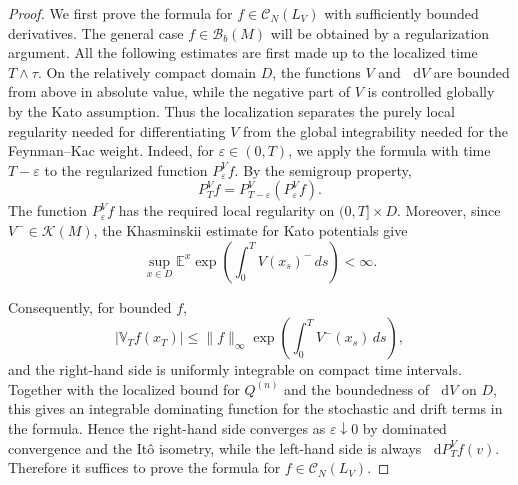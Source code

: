 \documentclass[11pt,twoside, reqno]{article}
\newcommand{\ed}{\mathop{}\!\mathrm{d}}
\newcommand\1{\mathbbm{1}}
\theoremstyle{definition}
\numberwithin{equation}{section}
\begin{document}
\begin{proof}
We first prove the formula for \(f\in\mathcal C_N(L_V)\) with sufficiently
bounded derivatives. The general case \(f\in\mathcal B_b(M)\) will be obtained
by a regularization argument. All the following estimates are first made
up to the localized time \(T\wedge\tau\).  On the relatively compact domain
\(D\), the functions \(V\) and \(\ed V\) are bounded from above in absolute
value, while the negative part of \(V\) is controlled globally by the Kato
assumption.  Thus the localization separates the purely local regularity
needed for differentiating \(V\) from the global integrability needed for the
Feynman--Kac weight.
Indeed, for \(\varepsilon\in(0,T)\), we apply the formula with time
\(T-\varepsilon\) to the regularized function \(P_\varepsilon^Vf\). By the
semigroup property,
\[
        P_T^Vf=P_{T-\varepsilon}^V(P_\varepsilon^Vf).
\]
The function \(P_\varepsilon^Vf\) has the required local regularity on
\((0,T]\times D\). Moreover, since $V^-\in \mathcal{K}(M)$, the
Khasminskii estimate for Kato potentials give
\[
        \sup_{x\in D}
        \mathbb E^x
        \exp\left(
        \int_0^T V(x_s)^-\,ds
        \right)<\infty.
\]

Consequently, for bounded \(f\),
\[
        |\mathbb V_T f(x_T)|
        \le \|f\|_\infty
        \exp\left(\int_0^T V^-(x_s)\,ds\right),
\]
and the right-hand side is uniformly integrable on compact time intervals.
Together with the localized bound for \(Q^{(n)}\) and the boundedness of
\(\ed V\) on \(D\), this gives an integrable dominating function for the
stochastic and drift terms in the formula.
 Hence the right-hand side converges as
\(\varepsilon\downarrow0\) by dominated convergence and the It\^o isometry,
while the left-hand side is always \(\ed P_T^Vf(v)\). Therefore it suffices to prove
the formula for \(f\in\mathcal C_N(L_V)\).




\end{proof}
\end{document}
